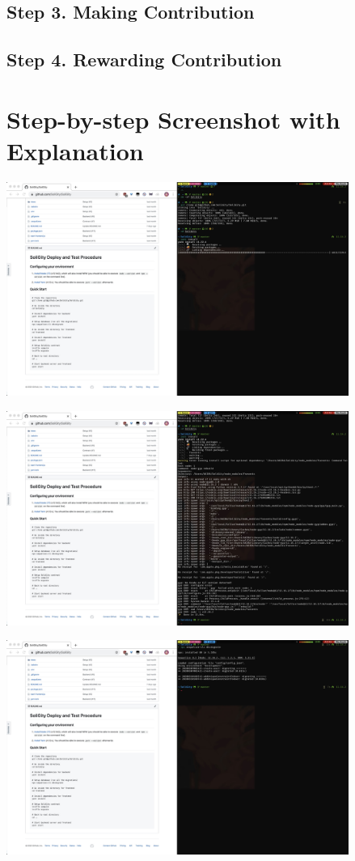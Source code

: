 \documentclass[12pt]{article}
\renewcommand{\_}{\kern-1.5pt\textunderscore\kern-1.5pt}
\begin{document}
\subsection*{Step 3. Making Contribution}



\subsection*{Step 4. Rewarding Contribution}



\section{Step-by-step Screenshot with Explanation}

\includegraphics[height=7cm]{graphs/01. git_clone}

\includegraphics[height=7cm]{graphs/02. yarn_install_backend}

\includegraphics[height=7cm]{graphs/03. user_db_migrate}
\end{document}

